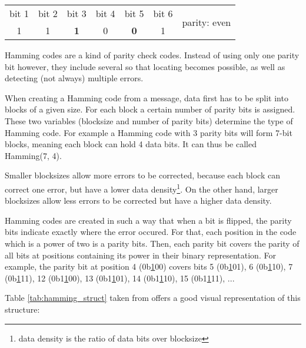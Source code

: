\def\arraystretch{1.2}
\begin{center}
  \begin{tabular}{|c|c|c|c|c|c|c}
    \cline{1-6}
    bit 1 & bit 2 & bit 3 & bit 4 & bit 5 & bit 6 & \multirow{2}{*}{parity: even} \\
    \cline{1-6}
    1 & 1 & \textbf{1} & 0 & \textbf{0} & 1 & \\
    \cline{1-6}
  \end{tabular}
\end{center}
\def\arraystretch{1}

Hamming codes are a kind of parity check codes.
Instead of using only one parity bit however, they include several so that locating becomes possible, as well as detecting (not always) multiple errors.

When creating a Hamming code from a message, data first has to be split into blocks of a given size. For each block a certain number of parity bits is assigned. These two variables (blocksize and number of parity bits) determine the type of Hamming code.
For example a Hamming code with 3 parity bits will form 7-bit blocks, meaning each block can hold 4 data bits. It can thus be called Hamming(7, 4).

Smaller blocksizes allow more errors to be corrected, because each block can correct one error, but have a lower data density\footnote{data density is the ratio of data bits over blocksize}. On the other hand, larger blocksizes allow less errors to be corrected but have a higher data density.

Hamming codes are created in such a way that when a bit is flipped, the parity bits indicate exactly where the error occured. For that, each position in the code which is a power of two is a parity bits. Then, each parity bit covers the parity of all bits at positions containing its power in their binary representation. For example, the parity bit at position 4 (0b\ul{1}00) covers bits 5 (0b\ul{1}01), 6 (0b\ul{1}10), 7 (0b\ul{1}11), 12 (0b1\ul{1}00), 13 (0b1\ul{1}01), 14 (0b1\ul{1}10), 15 (0b1\ul{1}11), ...

Table \ref{tab:hamming_struct} taken from \cite{hamming_wiki} offers a good visual representation of this structure:

